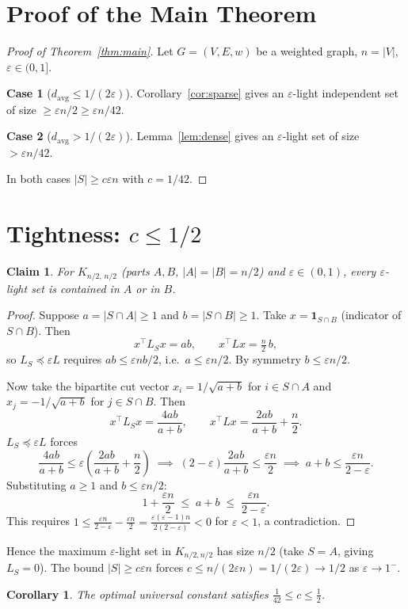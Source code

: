 \documentclass[12pt]{article}
\newtheorem{corollary}[theorem]{Corollary}
\newtheorem{claim}[theorem]{Claim}
\theoremstyle{definition}
\theoremstyle{remark}
\begin{document}
\section{Proof of the Main Theorem}

\begin{proof}[Proof of Theorem~\ref{thm:main}]
Let $G=(V,E,w)$ be a weighted graph, $n=|V|$, $\varepsilon\in(0,1]$.

\textbf{Case 1} ($d_{\mathrm{avg}}\le1/(2\varepsilon)$).
Corollary~\ref{cor:sparse} gives an $\varepsilon$-light independent set
of size $\ge\varepsilon n/2\ge\varepsilon n/42$.

\textbf{Case 2} ($d_{\mathrm{avg}}>1/(2\varepsilon)$).
Lemma~\ref{lem:dense} gives an $\varepsilon$-light set of size
$>\varepsilon n/42$.

In both cases $|S|\ge c\varepsilon n$ with $c=1/42$.
\end{proof}

\section{Tightness: $c\le1/2$}

\begin{claim}
For $K_{n/2,\,n/2}$ (parts $A,B$, $|A|=|B|=n/2$) and $\varepsilon\in(0,1)$,
every $\varepsilon$-light set is contained in $A$ or in $B$.
\end{claim}

\begin{proof}
Suppose $a=|S\cap A|\ge1$ and $b=|S\cap B|\ge1$.
Take $x=\mathbf{1}_{S\cap B}$ (indicator of $S\cap B$).  Then
\[
  x^\top L_S x=a b,\qquad
  x^\top L x=\tfrac{n}{2}\,b,
\]
so $L_S\preceq\varepsilon L$ requires $ab\le\varepsilon nb/2$, i.e.\ $a\le\varepsilon n/2$.
By symmetry $b\le\varepsilon n/2$.

Now take the bipartite cut vector
$x_i=1/\sqrt{a+b}$ for $i\in S\cap A$ and $x_j=-1/\sqrt{a+b}$ for $j\in S\cap B$.
Then
\[
  x^\top L_S x=\frac{4ab}{a+b},\qquad
  x^\top Lx=\frac{2ab}{a+b}+\frac{n}{2}.
\]
$L_S\preceq\varepsilon L$ forces
\[
  \frac{4ab}{a+b}\le\varepsilon\!\left(\frac{2ab}{a+b}+\frac{n}{2}\right)
  \;\implies\;
  (2-\varepsilon)\frac{2ab}{a+b}\le\frac{\varepsilon n}{2}
  \;\implies\;
  a+b\le\frac{\varepsilon n}{2-\varepsilon}.
\]
Substituting $a\ge1$ and $b\le\varepsilon n/2$:
\[
  1+\frac{\varepsilon n}{2}\;\le\; a+b\;\le\;\frac{\varepsilon n}{2-\varepsilon}.
\]
This requires $1\le\frac{\varepsilon n}{2-\varepsilon}-\frac{\varepsilon n}{2}
=\frac{\varepsilon(\varepsilon-1)n}{2(2-\varepsilon)}<0$ for $\varepsilon<1$,
a contradiction.
\end{proof}

\noindent Hence the maximum $\varepsilon$-light set in $K_{n/2,n/2}$ has size
$n/2$ (take $S=A$, giving $L_S=0$).  The bound $|S|\ge c\varepsilon n$ forces
$c\le n/(2\varepsilon n)=1/(2\varepsilon)\to1/2$ as $\varepsilon\to1^-$.

\begin{corollary}
The optimal universal constant satisfies $\tfrac{1}{42}\le c\le\tfrac{1}{2}$.
\end{corollary}
\end{document}
